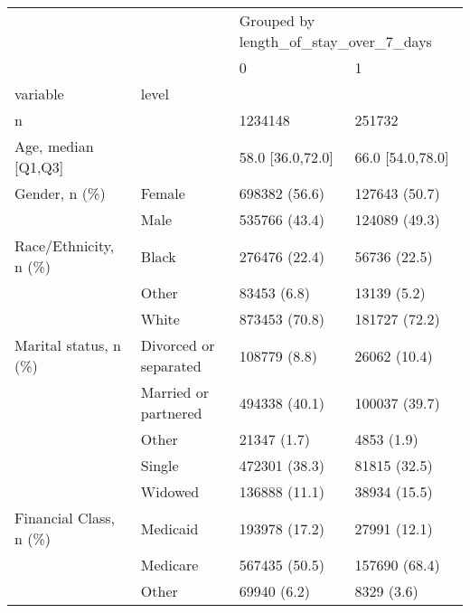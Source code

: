 \begin{tabular}{llll}
\toprule
                                       &   & \multicolumn{2}{l}{Grouped by length\_of\_stay\_over\_7\_days} \\
                                       &   &                                     0 &                  1 \\
variable & level &                                       &                    \\
\midrule
n &   &                               1234148 &             251732 \\
Age, median [Q1,Q3] &   &                      58.0 [36.0,72.0] &   66.0 [54.0,78.0] \\
Gender, n (\%) & Female &                         698382 (56.6) &      127643 (50.7) \\
                                       & Male &                         535766 (43.4) &      124089 (49.3) \\
Race/Ethnicity, n (\%) & Black &                         276476 (22.4) &       56736 (22.5) \\
                                       & Other &                           83453 (6.8) &        13139 (5.2) \\
                                       & White &                         873453 (70.8) &      181727 (72.2) \\
Marital status, n (\%) & Divorced or separated &                          108779 (8.8) &       26062 (10.4) \\
                                       & Married or partnered &                         494338 (40.1) &      100037 (39.7) \\
                                       & Other &                           21347 (1.7) &         4853 (1.9) \\
                                       & Single &                         472301 (38.3) &       81815 (32.5) \\
                                       & Widowed &                         136888 (11.1) &       38934 (15.5) \\
Financial Class, n (\%) & Medicaid &                         193978 (17.2) &       27991 (12.1) \\
                                       & Medicare &                         567435 (50.5) &      157690 (68.4) \\
                                       & Other &                           69940 (6.2) &         8329 (3.6) \\

\end{tabular}
